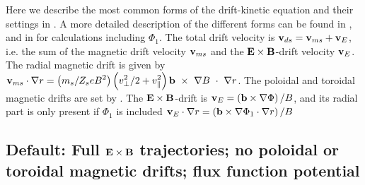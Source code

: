 Here we describe the most common forms of the drift-kinetic equation and their settings in \sfincs. 
A more detailed description of the different forms can be found in \cite{sfincsPaper}, and in \cite{Mollen2018} for calculations including $\Phi_1$. 
The total drift velocity is ${\mathbf v}_{ds} = {\mathbf v}_{ms} + {\mathbf v}_{E}$, i.e. the sum of the magnetic drift velocity ${\mathbf v}_{ms}$ and the ${\mathbf E} \times {\mathbf B}$-drift velocity ${\mathbf v}_{E}$. 
The radial magnetic drift is given by $\displaystyle {\mathbf v}_{ms} \cdot \nabla r = \left(m_s/Z_s e B^2\right) \left( v_{\perp}^2/2  + v_\|^2 \right) {\mathbf b}~\times~\nabla B~\cdot~\nabla r$. 
The poloidal and toroidal magnetic drifts are set by . 
The ${\mathbf E} \times {\mathbf B}$-drift is ${\mathbf v}_E = \left({\mathbf b} \times \nabla \Phi \right) / B$, and its radial part is only present if $\Phi_1$ is included $\displaystyle {\mathbf v}_{E} \cdot \nabla r = \left({\mathbf b} \times \nabla \Phi_1 \cdot \nabla r\right) / B$

\subsection{Default: Full ${\mathbf E}\times{\mathbf B}$ trajectories; no poloidal or toroidal magnetic drifts; flux function potential}

